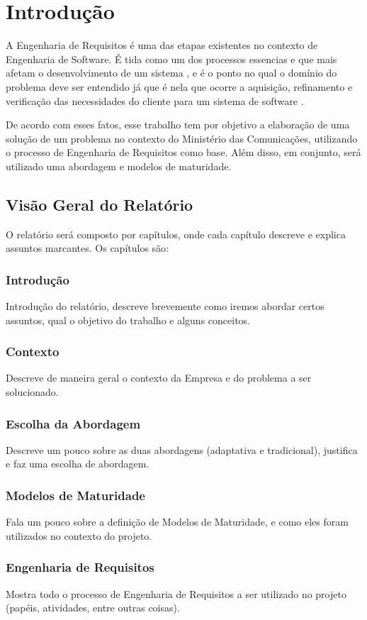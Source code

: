 \chapter[Introdução]{Introdução}

A Engenharia de Requisitos é uma das etapas existentes no contexto de Engenharia de Software. É tida como um dos processos essencias e que mais  afetam o desenvolvimento de um sistema \cite{hofmann001}, e é o ponto no qual o domínio do problema deve ser entendido já que é nela que ocorre a aquisição, refinamento e verificação das necessidades do cliente para um sistema de software \cite{ieee001}.

De acordo com esses fatos, esse trabalho tem por objetivo a elaboração de uma solução de um problema no contexto do Ministério das Comunicações, utilizando o processo de Engenharia de Requisitos como base. Além disso, em conjunto, será utilizado uma abordagem e modelos de maturidade.

\section{Visão Geral do Relatório}
O relatório será composto por capítulos, onde cada capítulo descreve e explica assuntos marcantes. Os capítulos são:

\subsection{Introdução}
Introdução do relatório, descreve brevemente como iremos abordar certos assuntos, qual o objetivo do trabalho e alguns conceitos.
\subsection{Contexto}
Descreve de maneira geral o contexto da Empresa e do problema a ser solucionado.
\subsection{Escolha da Abordagem}
Descreve um pouco sobre as duas abordagens (adaptativa e tradicional), justifica e faz uma escolha de abordagem.
\subsection{Modelos de Maturidade}
Fala um pouco sobre a definição de Modelos de Maturidade, e como eles foram utilizados no contexto do projeto.
\subsection{Engenharia de Requisitos}
Mostra todo o processo de Engenharia de Requisitos a ser utilizado no projeto (papéis, atividades, entre outras coisas).
